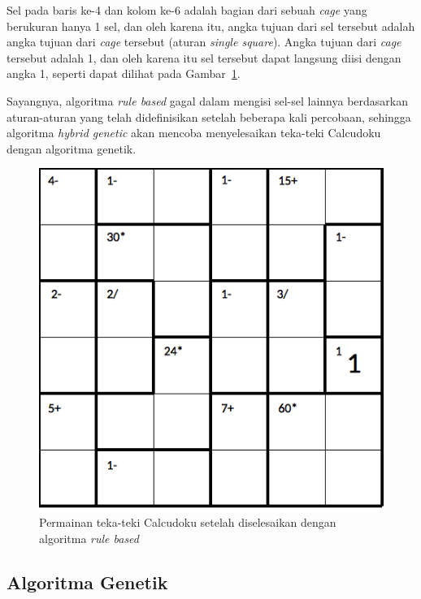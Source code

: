Sel pada baris ke-4 dan kolom ke-6 adalah bagian dari sebuah \textit{cage} yang berukuran hanya 1 sel, dan oleh karena itu, angka tujuan dari sel tersebut adalah angka tujuan dari \textit{cage} tersebut (aturan \textit{single square}). Angka tujuan dari \textit{cage} tersebut adalah 1, dan oleh karena itu sel tersebut dapat langsung diisi dengan angka 1, seperti dapat dilihat pada Gambar~\ref{fig:analisishg2}.

Sayangnya, algoritma \textit{rule based} gagal dalam mengisi sel-sel lainnya berdasarkan aturan-aturan yang telah didefinisikan setelah beberapa kali percobaan, sehingga algoritma \textit{hybrid genetic} akan mencoba menyelesaikan teka-teki Calcudoku dengan algoritma genetik.

\begin{figure}
\centering
\captionsetup{justification=centering}
\includegraphics[scale=0.333]{Gambar/hybridgenetic/PuzzleAfterRuleBased}
\caption[Permainan teka-teki Calcudoku setelah diselesaikan dengan algoritma \textit{rule based}]{Permainan teka-teki Calcudoku setelah diselesaikan dengan algoritma \textit{rule based}}
\label{fig:analisishg2}
\end{figure}

\subsection{Algoritma Genetik}
\label{sec:analisisgenetik}

